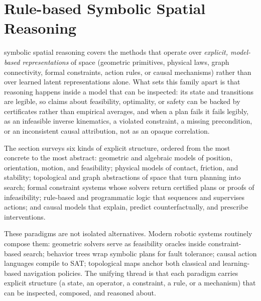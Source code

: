 \section{Rule-based Symbolic Spatial Reasoning}
\label{sec:p3_s7_1}

 symbolic spatial reasoning covers the methods that operate over \emph{explicit, model-based representations} of space (geometric primitives, physical laws, graph connectivity, formal constraints, action rules, or causal mechanisms) rather than over learned latent representations alone. What sets this family apart is that reasoning happens inside a model that can be inspected: its state and transitions are legible, so claims about feasibility, optimality, or safety can be backed by certificates rather than empirical averages, and when a plan fails it fails legibly, as an infeasible inverse kinematics, a violated constraint, a missing precondition, or an inconsistent causal attribution, not as an opaque correlation.

The section surveys six kinds of explicit structure, ordered from the most concrete to the most abstract: geometric and algebraic models of position, orientation, motion, and feasibility; physical models of contact, friction, and stability; topological and graph abstractions of space that turn planning into search; formal constraint systems whose solvers return certified plans or proofs of infeasibility; rule-based and programmatic logic that sequences and supervises actions; and causal models that explain, predict counterfactually, and prescribe interventions.

These paradigms are not isolated alternatives. Modern robotic systems routinely compose them: geometric solvers serve as feasibility oracles inside constraint-based search; behavior trees wrap symbolic plans for fault tolerance; causal action languages compile to SAT; topological maps anchor both classical and learning-based navigation policies. The unifying thread is that each paradigm carries explicit structure (a state, an operator, a constraint, a rule, or a mechanism) that can be inspected, composed, and reasoned about.









